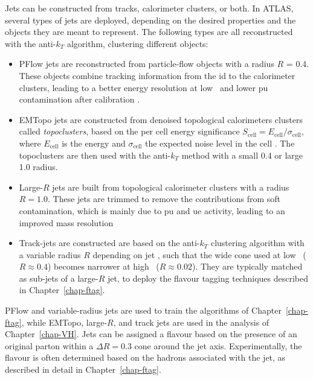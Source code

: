 Jets can be constructed from tracks, calorimeter clusters, or both. In ATLAS, several types of jets are deployed, depending on the desired properties and the objects they are meant to represent. The following types are all reconstructed with the anti-$k_T$ algorithm, clustering different objects:
\begin{itemize}[leftmargin=*]
\item PFlow jets are reconstructed from particle-flow objects \cite{atlasPFLOWjet} with a radius $R$ = 0.4. These objects combine tracking information from the \gls{id} to the calorimeter clusters, leading to a better energy resolution at low \pt\ and lower \gls{pu} contamination after calibration \cite{PhysRevD.96.072002}.
\item EMTopo jets are constructed from denoised topological calorimeters clusters called \textit{topoclusters}, based on the per cell energy significance $S_{\text{cell}} = E_{\text{cell}} / \sigma_{\text{cell}}$, where $E_{\text{cell}}$ is the energy and $\sigma_{\text{cell}}$ the expected noise level in the cell \cite{atlasEMTOpo}. The topoclusters are then used with the anti-$k_T$ method with a small 0.4 or large 1.0 radius.
\item Large-$R$ jets are built from topological calorimeter clusters with a radius $R = 1.0$. These jets are trimmed to remove the contributions from soft contamination, which is mainly due to \gls{pu} and \gls{ue} activity, leading to an improved mass resolution \cite{ATLAS:largeRjet}
\item Track-jets are constructed are based on the anti-$k_T$ clustering algorithm with a variable radius $R$ depending on jet \pt, such that the wide cone used at low \pt\ ($R \approx 0.4$) becomes narrower at high \pt\ ($R \approx 0.02$). They are typically matched as sub-jets of a large-$R$ jet, to deploy the flavour tagging techniques described in Chapter~\ref{chap-ftag}.
\end{itemize}
PFlow and variable-radius jets are used to train the algorithms of Chapter~\ref{chap-ftag}, while EMTopo, large-$R$, and track jets are used in the analysis of Chapter~\ref{chap-VH}. Jets can be assigned a flavour based on the presence of an original parton within a $\Delta R = 0.3$ cone around the jet axis. Experimentally, the flavour is often determined based on the hadrons associated with the jet, as described in detail in Chapter~\ref{chap-ftag}. \\

